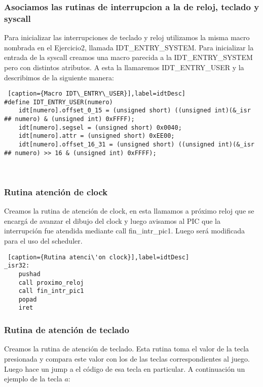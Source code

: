 \subsubsection*{Asociamos las rutinas de interrupcion a la de reloj, teclado y syscall}
\par{Para inicializar las interrupciones de teclado y reloj utilizamos la misma macro nombrada en el Ejercicio2, llamada IDT\_ENTRY\_SYSTEM. Para inicializar la entrada de la syscall creamos una macro parecida a la IDT\_ENTRY\_SYSTEM pero con distintos atributos. A esta la llamaremos IDT\_ENTRY\_USER y la describimos de la siguiente manera:}

\begin{lstlisting} [caption={Macro IDT\_ENTRY\_USER}],label=idtDesc] 
#define IDT_ENTRY_USER(numero)                                         
    idt[numero].offset_0_15 = (unsigned short) ((unsigned int)(&_isr ## numero) & (unsigned int) 0xFFFF); 
    idt[numero].segsel = (unsigned short) 0x0040;
    idt[numero].attr = (unsigned short) 0xEE00;
    idt[numero].offset_16_31 = (unsigned short) ((unsigned int)(&_isr ## numero) >> 16 & (unsigned int) 0xFFFF);
\end{lstlisting}


\\
\subsubsection*{Rutina atenci\'on de clock}
\par{Creamos la rutina de atenci\'on de clock, en esta llamamos a pr\'oximo reloj que se encarg\'a de avanzar el dibujo del clock y luego avisamos al PIC que la interrupci\'on fue atendida mediante call fin\_intr\_pic1. Luego ser\'a modificada para el uso del scheduler.}
\begin{lstlisting} [caption={Rutina atenci\'on clock}],label=idtDesc] 
_isr32:
    pushad
    call proximo_reloj
    call fin_intr_pic1
    popad
    iret

\end{lstlisting}

\subsubsection*{Rutina de atenci\'on de teclado}
\par{Creamos la rutina de atenci\'on de teclado. Esta rutina toma el valor de la tecla presionada y compara este valor con los de las teclas correspondientes al juego. Luego hace un jump a el c\'odigo de esa tecla en particular. A continuaci\'on un ejemplo de la tecla $a$:}

